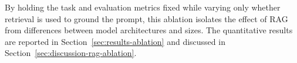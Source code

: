 %
By holding the task and evaluation metrics fixed while varying only whether retrieval is used to
ground the prompt, this ablation isolates the effect of RAG from differences between model
architectures and sizes. The quantitative results are reported in
Section~\ref{sec:results-ablation} and discussed in Section~\ref{sec:discussion-rag-ablation}.
